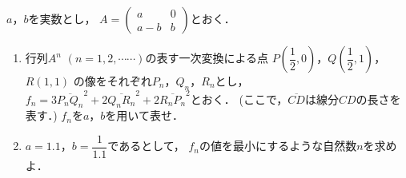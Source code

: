 \documentclass[../../main.tex]{subfiles}
\begin{document}
$a$，$b$を実数とし，
$A=
\begin{pmatrix} a & 0 \\ a-b & b
\end{pmatrix}$とおく．
\begin{enumerate}
  \item 行列$A^n$ $(n=1,2,\cdots\cdots)$の表す一次変換による点
    $\displaystyle P \left( \dfrac{1}{2},0 \right)$，$\displaystyle Q \left( \dfrac{1}{2},1 \right)$，$R(1,1)$
    の像をそれぞれ$P_n$，$Q_n$，$R_n$とし，
    $f_n=3\overline{P_nQ_n}^2+2\overline{Q_nR_n}^2+2\overline{R_nP_n}^2$とおく．
    (ここで，$\overline{CD}$は線分$CD$の長さを表す．)
    $f_n$を$a$，$b$を用いて表せ．
  \item $a=1.1$，$\displaystyle b=\dfrac{1}{1.1}$であるとして，
    $f_n$の値を最小にするような自然数$n$を求めよ．
\end{enumerate}
\end{document}
